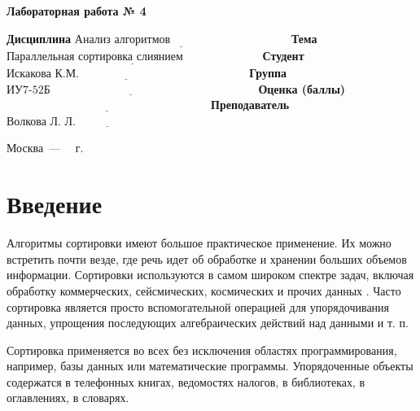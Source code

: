 \documentclass[12pt]{report}
\begin{document}
\begin{center}
\Large\textbf{Лабораторная работа № 4}
\end{center}
\vspace{\baselineskip}
\noindent\textbf{Дисциплина} $\underline{\text{Анализ алгоритмов~~~~~~~~~~~~~~~~~~~~~~~~~~~~~~~}}$\newline\newline
\noindent\textbf{Тема} $\underline{\text{Параллельная сортировка слиянием~~~~~~~~~~~~~~~~~~~~}}$\newline\newline
\noindent\textbf{Студент} $\underline{\text{Искакова К.М.~~~~~~~~~~~~~~~~~~~~~~~~~~~~~~~~~~~~~~~~~~~~}}$\newline\newline
\noindent\textbf{Группа} $\underline{\text{ИУ7-52Б~~~~~~~~~~~~~~~~~~~~~~~~~~~~~~~~~~~~~~~~~~~~~~~~~~~~~~}}$\newline\newline
\noindent\textbf{Оценка (баллы)} $\underline{\text{~~~~~~~~~~~~~~~~~~~~~~~~~~~~~~~~~~~~~~~~~~~~~~~~~~~~~}}$\newline\newline
\noindent\textbf{Преподаватель} $\underline{\text{Волкова Л. Л.~~~~~~~~~~~~~~~~~~~~~~~~~~~~~~~~~~~}}$\newline

\begin{center}
	\vfill
	Москва~---~\the\year
	~г.
\end{center}
\clearpage

%
\renewcommand\contentsname{Содержание}

\tableofcontents

\newpage
\chapter*{Введение}
Алгоритмы сортировки имеют большое практическое применение.
Их можно встретить почти везде, где речь идет об обработке и хранении больших объемов информации.
Сортировки используются в самом широком спектре задач, включая обработку коммерческих, сейсмических, космических и прочих данных \cite{academy}.
Часто сортировка является просто вспомогательной операцией для упорядочивания данных, упрощения последующих алгебраических действий над данными и т. п.

Сортировка применяется во всех без исключения областях программирования, например, базы данных или математические программы.
Упорядоченные объекты содержатся в телефонных книгах, ведомостях налогов, в библиотеках, в оглавлениях, в словарях.
\end{document}
